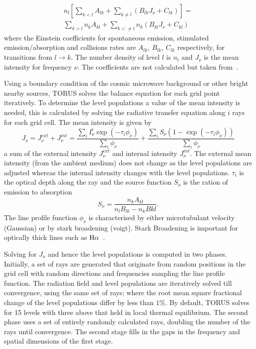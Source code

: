 \documentclass[fleqn,usenatbib]{mnras}
\begin{document}
\begin{multline}
n_{l}\left[ \sum_{k<l}A_{lk} + \sum_{k\neq l}\left( B_{lk}J_{\nu} +C_{lk}\right)\right] = \\
\sum_{k>l}n_{k}A_{kl} + \sum_{k<\neq l} n_{k}\left(B_{kl}J_{\nu}+C_{kl} \right)
\label{eq:balance}
\end{multline}
where the Einstein coefficients for spontaneous emission, stimulated emission/absorption and collisions rates are $A_{lk}$, $B_{lk}$, $C_{lk}$ respectively, for transitions from $l\rightarrow k$. The number density of level $l$ is $n_l$ and $J_{\nu}$ is the mean intensity for frequency $\nu$. The coefficients are not calculated but taken from~\citet{Schoier:2005ja}.

Using a boundary condition of the cosmic microwave background or other bright nearby sources, TORUS solves the balance equation for each grid point iteratively. To determine the level populations a value of the mean intensity is needed, this is calculated by solving the radiative transfer equation along $i$ rays for each grid cell. The mean intensity is given by
\begin{equation}
    J_{\nu}=J_{\nu}^{ext}+J_{\nu}^{int}=\frac{\sum_{i}I_{\nu}^{i}\exp{\left(-\tau_{i}\phi_{\nu}\right)}}{\sum_{i}\phi_{\nu}}+\frac{\sum_{i}S_{\nu}\left(1-\exp{\left(-\tau_{i}\phi_{\nu}\right)}\right)}{\sum_{i}\phi_{\nu}}
    \label{eq:meanintensity}
\end{equation}
a sum of the external intensity $J_{\nu}^{ext}$ and internal intensity $J_{\nu}^{int}$. The external mean intensity (from the ambient medium) does not change as the level populations are adjusted whereas the internal intensity changes with the level populations. $\tau_{i}$ is the optical depth along the ray and the source function $S_{\nu}$ is the ration of emission to absorption
\begin{equation}
    S_{\nu}=\frac{n_{k}A_{kl}}{n_{l}B_{lk}-n_{k}B{kl}}.
    \label{eq:sourcefunction}
\end{equation}
The line profile function $\phi_{\nu}$ is characterised by either microtubulant velocity (Gaussian) or by stark broadening (voigt). Stark Broadening is important for optically thick lines such as ${\rm H}\alpha$~\citep{Kurosawa:2011fh,1998ApJ...492..743M}.

Solving for $J_{\nu}$ and hence the level populations is computed in two phases. Initially, a set of rays are generated that originate from random positions in the grid cell with random directions and frequencies sampling the line profile function. The radiation field and level populations are iteratively solved till convergence, using the same set of rays; where the root mean square fractional change of the level populations differ by less than $1\%$. By default, TORUS solves for 15 levels with three above that held in local thermal equilibrium. The second phase uses a set of entirely randomly calculated rays, doubling the number of the rays until convergence. The second stage fills in the gaps in the frequency and spatial dimensions of the first stage. 
\end{document}
